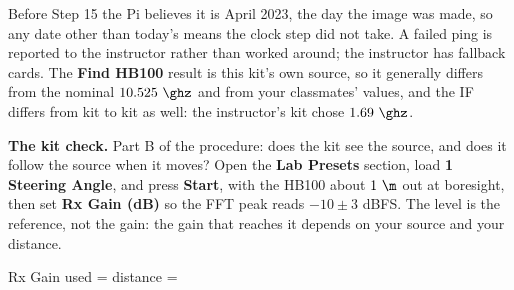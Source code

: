 \documentclass{exam}
\newif\ifkey
\newcommand{\kv}[1]{\ifkey{\color{red}#1}\fi\rule[-0.10in]{0pt}{0.34in}}
\begin{document}
\begin{questions}
\begin{solution}
Before Step 15 the Pi believes it is April 2023, the day the image was made,
so any date other than today's means the clock step did not take. A failed
ping is reported to the instructor rather than worked around; the instructor
has fallback cards. The \textbf{Find HB100} result is this kit's own source,
so it generally differs from the nominal $10.525\ \ghz$ and from your
classmates' values, and the IF differs from kit to kit as well: the instructor's kit
chose $1.69\ \ghz$.
\end{solution}

\question \textbf{The kit check.} Part B of the procedure: does the kit see
the source, and does it follow the source when it moves? Open the \textbf{Lab Presets} section, load
\textbf{1 Steering Angle}, and press \textbf{Start}, with the HB100 about $1\ \m$ out at
boresight, then set \textbf{Rx Gain (dB)} so the FFT peak reads
$-10 \pm 3$ dBFS. The level is the reference, not the gain: the gain that
reaches it depends on your source and your distance.

\begin{center}
Rx Gain used =  \qquad
distance = 
\end{center}

\end{questions}
\end{document}
